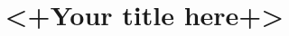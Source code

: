 \documentclass[12pt,notitlepage]{article}
\begin{document}
\title{<+Your title here+>}
\author{}
\date{}
\maketitle


\end{document}
